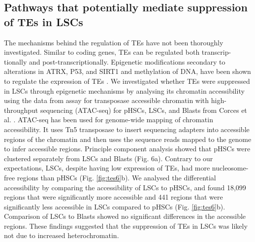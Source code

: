 \subsection{Pathways that potentially mediate suppression of TEs in LSCs}
The mechanisms behind the regulation of TEs have not been thoroughly investigated. Similar to coding genes, TEs can be regulated both transcrip- tionally and post-transcriptionally. Epigenetic modifications secondary to alterations in ATRX, P53, and SIRT1 and methylation of DNA, have been shown to regulate the expression of TEs \cite{Leonova2013,Elsasser2015,Meter2014}. We investigated whether TEs were suppressed in LSCs through epigenetic mechanisms by analysing its chromatin accessibility using the data from assay for transposase accessible chromatin with high-throughput sequencing (ATAC-seq) for pHSCs, LSCs, and Blasts from Corces et al. \cite{Corces2016}. ATAC-seq has been used for genome-wide mapping of chromatin accessibility. It uses Tn5 transposase to insert sequencing adapters into accessible regions of the chromatin and then uses the sequence reads mapped to the genome to infer accessible regions. Principle component analysis showed that pHSCs were clustered separately from LSCs and Blasts (Fig. 6a). Contrary to our expectations, LSCs, despite having low expression of TEs, had more nucleosome-free regions than pHSCs (Fig. \ref{fig:tes6}b). We analysed the differential accessibility by comparing the accessibility of LSCs to pHSCs, and found 18,099 regions that were significantly more accessible and 441 regions that were significantly less accessible in LSCs compared to pHSCs (Fig. \ref{fig:tes6}b). Comparison of LSCs to Blasts showed no significant differences in the accessible regions. These findings suggested that the suppression of TEs in LSCs was likely not due to increased heterochromatin.


